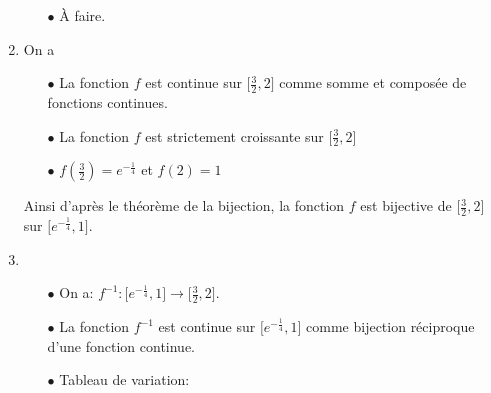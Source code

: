 \documentclass[a4paper, 11pt,reqno]{article}
\begin{document}
\begin{correction}
\begin{enumerate}
\begin{itemize}
			            \begin{center}
			            \end{center}
			      \item[$\bullet$] \`{A} faire.
		      \end{itemize}
		\item
		      On a
		      \begin{itemize}
			      \item[$\bullet$] La fonction $f$ est continue sur $\lbrack \frac{3}{2},2\rbrack$ comme somme et compos\'ee de fonctions
			            continues.
			      \item[$\bullet$] La fonction $f$ est strictement croissante sur $\lbrack \frac{3}{2},2\rbrack$
			      \item[$\bullet$] $f(\frac{3}{2})=e^{-\frac{1}{4}}$ et $f(2)=1$
		      \end{itemize}
		      Ainsi d'apr\`{e}s le th\'eor\`{e}me de la bijection, la fonction $f$ est bijective de $\lbrack \frac{3}{2},2\rbrack$ sur $\lbrack e^{-\frac{1}{4}}, 1\rbrack$.
		\item
		      \begin{itemize}
			      \item[$\bullet$] On a: $f^{-1}: \lbrack e^{-\frac{1}{4}}, 1\rbrack \rightarrow \lbrack \frac{3}{2},2\rbrack$.
			      \item[$\bullet$] La fonction $f^{-1}$ est continue sur $\lbrack e^{-\frac{1}{4}}, 1\rbrack$ comme bijection r\'eciproque d'une fonction continue.
			      \item[$\bullet$] Tableau de variation:
			            \begin{center}
\end{center}
\end{itemize}
\end{enumerate}
\end{correction}
\end{document}
